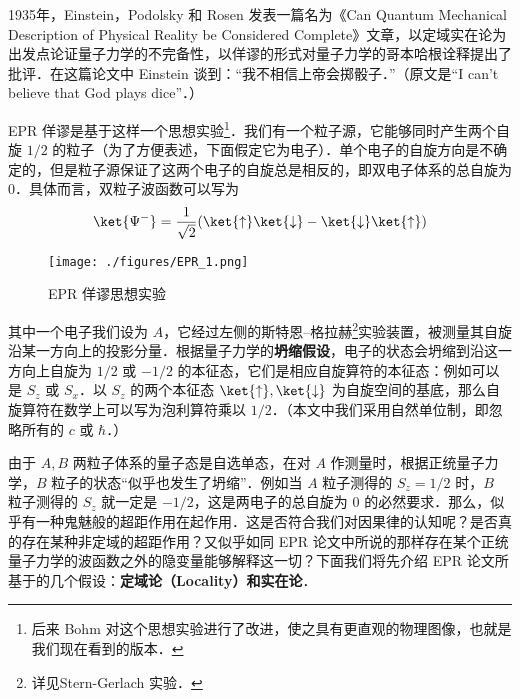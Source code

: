 
1935年，Einstein，Podolsky 和 Rosen 发表一篇名为《Can Quantum Mechanical Description of Physical Reality be Considered Complete》文章，以定域实在论为出发点论证量子力学的不完备性，以佯谬的形式对量子力学的哥本哈根诠释提出了批评．在这篇论文中 Einstein 谈到：“我不相信上帝会掷骰子．”（原文是“I can't believe that God plays dice”．） 

EPR 佯谬是基于这样一个思想实验\footnote{后来 Bohm 对这个思想实验进行了改进，使之具有更直观的物理图像，也就是我们现在看到的版本．}．我们有一个粒子源，它能够同时产生两个自旋 $1/2$ 的粒子（为了方便表述，下面假定它为电子）．单个电子的自旋方向是不确定的，但是粒子源保证了这两个电子的自旋总是相反的，即双电子体系的总自旋为 $0$．具体而言，双粒子波函数可以写为
\begin{equation}
\ket{\Psi^-}=\frac{1}{\sqrt{2}}(\ket{\uparrow}\ket{\downarrow}-\ket{\downarrow}\ket{\uparrow})
\end{equation}

\begin{figure}[ht]
\centering
\texttt{[image: ./figures/EPR\_1.png]}
\caption{EPR 佯谬思想实验} \label{EPR_fig1}
\end{figure}

其中一个电子我们设为 $A$，它经过左侧的斯特恩–格拉赫\footnote{详见Stern-Gerlach 实验．}实验装置，被测量其自旋沿某一方向上的投影分量．根据量子力学的\textbf{坍缩假设}，电子的状态会坍缩到沿这一方向上自旋为 $1/2$ 或 $-1/2$ 的本征态，它们是相应自旋算符的本征态：例如可以是 $S_z$ 或 $S_x$．以 $S_z$ 的两个本征态 $\ket{\uparrow},\ket{\downarrow}$ 为自旋空间的基底，那么自旋算符在数学上可以写为泡利算符乘以 $1/2$．（本文中我们采用自然单位制，即忽略所有的 $c$ 或 $\hbar$．）

由于 $A,B$ 两粒子体系的量子态是自选单态，在对 $A$ 作测量时，根据正统量子力学，$B$ 粒子的状态“似乎也发生了坍缩”．例如当 $A$ 粒子测得的 $S_z=1/2$ 时，$B$ 粒子测得的 $S_z$ 就一定是 $-1/2$，这是两电子的总自旋为 $0$ 的必然要求．那么，似乎有一种鬼魅般的超距作用在起作用．这是否符合我们对因果律的认知呢？是否真的存在某种非定域的超距作用？又似乎如同 EPR 论文中所说的那样存在某个正统量子力学的波函数之外的隐变量能够解释这一切？下面我们将先介绍 EPR 论文所基于的几个假设：\textbf{定域论（Locality）和实在论}．

